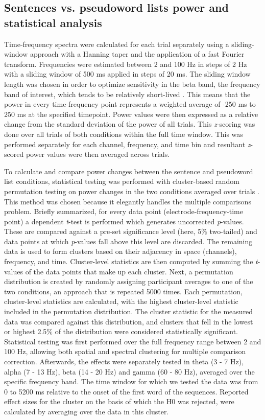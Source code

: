 \subsection{Sentences vs. pseudoword lists power and statistical analysis}
Time-frequency spectra were calculated for each trial separately using a sliding-window approach with a Hanning taper and the application of a fast Fourier transform. Frequencies were estimated between 2 and 100 Hz in steps of 2 Hz with a sliding window of 500 ms applied in steps of 20 ms. The sliding window length was chosen in order to optimize sensitivity in the beta band, the frequency band of interest, which tends to be relatively short-lived \citep{jones2016}. This means that the power in every time-frequency point represents a weighted average of -250 ms to 250 ms at the specified timepoint. Power values were then expressed as a relative change from the standard deviation of the power of all trials. This \textit{z}-scoring was done over all trials of both conditions within the full time window. This was performed separately for each channel, frequency, and time bin and resultant \textit{z}-scored power values were then averaged across trials. 

To calculate and compare power changes between the sentence and pseudoword list conditions, statistical testing was performed with cluster-based random permutation testing on power changes in the two conditions averaged over trials \citep{maris2007}. This method was chosen because it elegantly handles the multiple comparisons problem. Briefly summarized, for every data point (electrode-frequency-time point) a dependent \textit{t}-test is performed which generates uncorrected \textit{p}-values. These are compared against a pre-set significance level (here, 5\% two-tailed) and data points at which \textit{p}-values fall above this level are discarded. The remaining data is used to form clusters based on their adjacency in space (channels), frequency, and time. Cluster-level statistics are then computed by summing the \textit{t}-values of the data points that make up each cluster. Next, a permutation distribution is created by randomly assigning participant averages to one of the two conditions, an approach that is repeated 5000 times. Each permutation, cluster-level statistics are calculated, with the highest cluster-level statistic included in the permutation distribution. The cluster statistic for the measured data was compared against this distribution, and clusters that fell in the lowest or highest 2.5\% of the distribution were considered statistically significant. Statistical testing was first performed over the full frequency range between 2 and 100 Hz, allowing both spatial and spectral clustering for multiple comparison correction. Afterwards, the effects were separately tested in theta (3 - 7 Hz), alpha (7 - 13 Hz), beta (14 - 20 Hz) and gamma (60 - 80 Hz), averaged over the specific frequency band. The time window for which we tested the data was from 0 to 5200 ms relative to the onset of the first word of the sequences. Reported effect sizes for the cluster on the basis of which the H0 was rejected, were calculated by averaging over the data in this cluster. 

